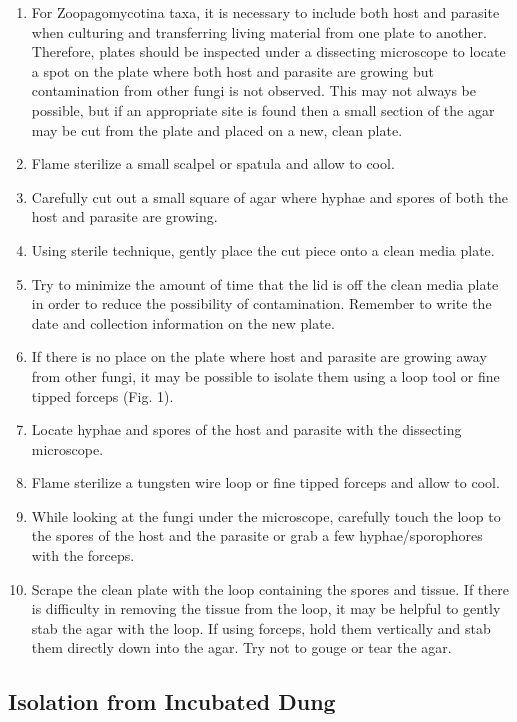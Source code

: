 \documentclass[]{book}
\providecommand{\tightlist}{%
  \setlength{\itemsep}{0pt}\setlength{\parskip}{0pt}}
\begin{document}
\begin{enumerate}
\def\labelenumi{\arabic{enumi}.}
\tightlist
\item
  For Zoopagomycotina taxa, it is necessary to include both host and
  parasite when culturing and transferring living material from one
  plate to another. Therefore, plates should be inspected under a
  dissecting microscope to locate a spot on the plate where both host
  and parasite are growing but contamination from other fungi is not
  observed. This may not always be possible, but if an appropriate site
  is found then a small section of the agar may be cut from the plate
  and placed on a new, clean plate.
\item
  Flame sterilize a small scalpel or spatula and allow to cool.\\
\item
  Carefully cut out a small square of agar where hyphae and spores of
  both the host and parasite are growing.
\item
  Using sterile technique, gently place the cut piece onto a clean media
  plate.
\item
  Try to minimize the amount of time that the lid is off the clean media
  plate in order to reduce the possibility of contamination. Remember to
  write the date and collection information on the new plate.
\item
  If there is no place on the plate where host and parasite are growing
  away from other fungi, it may be possible to isolate them using a loop
  tool or fine tipped forceps (Fig. 1).
\item
  Locate hyphae and spores of the host and parasite with the dissecting
  microscope.
\item
  Flame sterilize a tungsten wire loop or fine tipped forceps and allow
  to cool.
\item
  While looking at the fungi under the microscope, carefully touch the
  loop to the spores of the host and the parasite or grab a few
  hyphae/sporophores with the forceps.\\
\item
  Scrape the clean plate with the loop containing the spores and tissue.
  If there is difficulty in removing the tissue from the loop, it may be
  helpful to gently stab the agar with the loop. If using forceps, hold
  them vertically and stab them directly down into the agar. Try not to
  gouge or tear the agar.
\end{enumerate}

\subsection{Isolation from Incubated
Dung}\label{isolation-from-incubated-dung}
\end{document}
